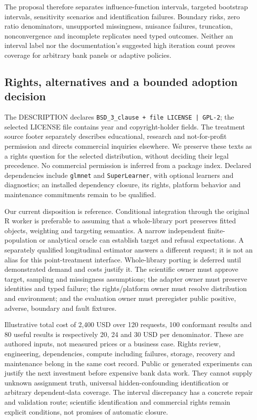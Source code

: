 The proposal therefore separates influence-function intervals, targeted
bootstrap intervals, sensitivity scenarios and identification failures. Boundary
risks, zero ratio denominators, unsupported missingness, nuisance failures,
truncation, nonconvergence and incomplete replicates need typed outcomes.
Neither an interval label nor the documentation's suggested high iteration
count proves coverage for arbitrary bank panels or adaptive policies.
\citep{exec24_tmle_contract}

\subsection{Rights, alternatives and a bounded adoption decision}
The DESCRIPTION declares \texttt{BSD\_3\_clause + file LICENSE | GPL-2}; the
selected LICENSE file contains year and copyright-holder fields. The treatment
source footer separately describes educational, research and not-for-profit
permission and directs commercial inquiries elsewhere. We preserve these
texts as a rights question for the selected distribution, without deciding their
legal precedence. No commercial permission is inferred from a package index.
Declared dependencies include \texttt{glmnet} and \texttt{SuperLearner}, with
optional learners and diagnostics; an installed dependency closure, its rights,
platform behavior and maintenance commitments remain to be qualified.
\citep{exec24_tmle_sources}

Our current disposition is reference. Conditional integration through the
original R worker is preferable to assuming that a whole-library port preserves
fitted objects, weighting and targeting semantics. A narrow independent
finite-population or analytical oracle can establish target and refusal
expectations. A separately qualified longitudinal estimator answers a different
request; it is not an alias for this point-treatment interface. Whole-library
porting is deferred until demonstrated demand and costs justify it. The
scientific owner must approve target, sampling and missingness assumptions; the
adapter owner must preserve identities and typed failure; the rights/platform
owner must resolve distribution and environment; and the evaluation owner must
preregister public positive, adverse, boundary and fault fixtures.
\citep{exec24_tmle_contract}

Illustrative total cost of 2,400 USD over 120 requests, 100 conformant results
and 80 useful results is respectively 20, 24 and 30 USD per denominator. These
are authored inputs, not measured prices or a business case. Rights review,
engineering, dependencies, compute including failures, storage, recovery and
maintenance belong in the same cost record. Public or generated experiments
can justify the next investment before expensive bank data work. They cannot
supply unknown assignment truth, universal hidden-confounding identification
or arbitrary dependent-data coverage. The interval discrepancy has a concrete
repair and validation route; scientific identification and commercial rights
remain explicit conditions, not promises of automatic closure.
\citep{exec24_tmle_contract}
